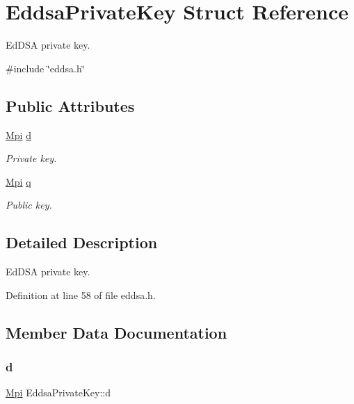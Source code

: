 \hypertarget{structEddsaPrivateKey}{}\section{Eddsa\+Private\+Key Struct Reference}
\label{structEddsaPrivateKey}


Ed\+D\+SA private key.  




{\ttfamily \#include \char`\"{}eddsa.\+h\char`\"{}}

\subsection*{Public Attributes}
\begin{DoxyCompactItemize}
\item 
\hyperlink{structMpi}{Mpi} \hyperlink{structEddsaPrivateKey_a58ef5164bc00df5a7ee8adc18fa2b63a}{d}
\begin{DoxyCompactList}\small\item\em Private key. \end{DoxyCompactList}\item 
\hyperlink{structMpi}{Mpi} \hyperlink{structEddsaPrivateKey_a8c25f892d557d9dbff5ddb01dd23a78d}{q}
\begin{DoxyCompactList}\small\item\em Public key. \end{DoxyCompactList}\end{DoxyCompactItemize}


\subsection{Detailed Description}
Ed\+D\+SA private key. 

Definition at line 58 of file eddsa.\+h.



\subsection{Member Data Documentation}
\mbox{\label{structEddsaPrivateKey_a58ef5164bc00df5a7ee8adc18fa2b63a}} 
\subsubsection{\texorpdfstring{d}{d}}
{\footnotesize\ttfamily \hyperlink{structMpi}{Mpi} Eddsa\+Private\+Key\+::d}




